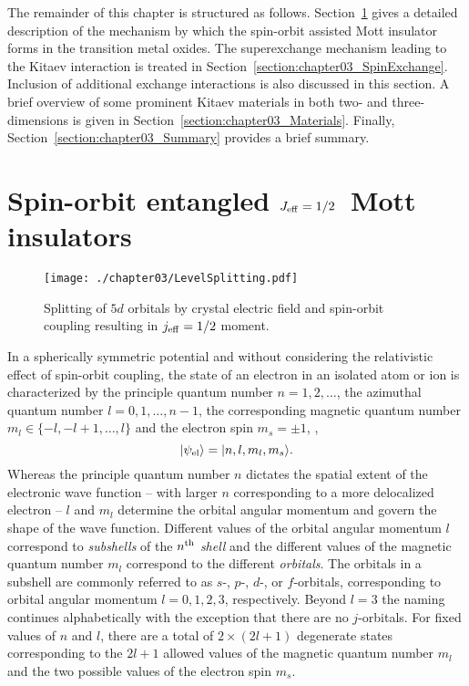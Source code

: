 The remainder of this chapter is structured as follows.
Section~\ref{section:chapter03_CFSO} gives a detailed description of the mechanism by which the spin-orbit assisted Mott insulator forms in the transition metal oxides.
The superexchange mechanism leading to the Kitaev interaction is treated in Section~\ref{section:chapter03_SpinExchange}.
Inclusion of additional exchange interactions is also discussed in this section.
A brief overview of some prominent Kitaev materials in both two- and three-dimensions is given in Section~\ref{section:chapter03_Materials}.
Finally, Section~\ref{section:chapter03_Summary} provides a brief summary.


%
%
\section{Spin-orbit entangled \texorpdfstring{$J_{\rm eff} = 1/2$}{Jeff=1/2}~Mott insulators}
\label{section:chapter03_CFSO}
%
%
%
\begin{figure}[tb]
	\centering
	\texttt{[image: ./chapter03/LevelSplitting.pdf]}
	\caption{
		Splitting of $5d$ orbitals by crystal electric field and spin-orbit coupling resulting in $j_{\rm eff} = 1/2$ moment.
	}
	\label{fig:chapter03_LevelSplitting}
\end{figure}
%
In a spherically symmetric potential and without considering the relativistic effect of spin-orbit coupling, the state of an electron in an isolated atom or ion is characterized by the principle quantum number $n = 1, 2, \ldots$, the azimuthal quantum number $l = 0, 1, \ldots, n - 1$, the corresponding magnetic quantum number $m_l \in \{-l, -l+1, \ldots, l\}$ and the electron spin $m_s = \pm 1$, \ie,
%
\begin{equation}
	| \psi_{\rm el} \rangle = | n, l, m_l, m_s \rangle.
\end{equation}
%
Whereas the principle quantum number $n$ dictates the spatial extent of the electronic wave function -- with larger $n$ corresponding to a more delocalized electron -- $l$ and $m_l$ determine the orbital angular momentum and govern the shape of the wave function.
Different values of the orbital angular momentum $l$ correspond to \textit{subshells} of the $n^{\rm th}$ \textit{shell} and the different values of the magnetic quantum number $m_l$ correspond to the different \textit{orbitals}.
The orbitals in a subshell are commonly referred to as $s$-, $p$-, $d$-, or $f$-orbitals, corresponding to orbital angular momentum $l=0, 1, 2, 3$, respectively.
Beyond $l = 3$ the naming continues alphabetically with the exception that there are no $j$-orbitals.
For fixed values of $n$ and $l$, there are a total of $2 \times (2l + 1)$ degenerate states corresponding to the $2l + 1$ allowed values of the magnetic quantum number $m_l$ and the two possible values of the electron spin $m_s$.

